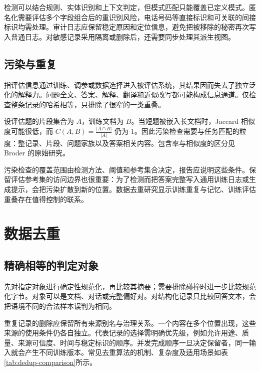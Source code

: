 \documentclass[../textbook.tex]{subfiles}
\begin{document}
检测可以结合规则、实体识别和上下文判定，但模式匹配只能覆盖已定义模式。匿名化需要评估多个字段组合后的重识别风险，电话号码等直接标识和可关联的间接标识均需处理。审计日志应保留稳定原因和定位信息，避免把被移除的秘密再次写入普通日志。对敏感记录采用隔离或删除后，还需要同步处理其派生视图。

\subsection{污染与重复}
指评估信息通过训练、调参或数据选择进入被评估系统，其结果因而失去了独立泛化的解释力。问题全文、答案、解释、翻译和近似改写都可能构成信息通道。仅检查整条记录的哈希相等，只排除了很窄的一类重叠。

设评估题的片段集合为 $A$，训练文档为 $B$。当短题被嵌入长文档时，Jaccard 相似度可能很低，而 $C(A,B)=\frac{|A\cap B|}{|A|}$ 仍为 $1$。因此污染检查需要与任务匹配的粒度：整记录、片段、问题家族以及答案相关内容。包含率与相似度的区分见 Broder 的原始研究\cite{broder1997resemblance}。

污染检查的覆盖范围由检测方法、阈值和参考集合决定，报告应说明这些条件。保留评估参考集的访问边界也很重要：为了检测而把答案完整写入通用训练日志或生成提示，会把污染扩散到新的位置。数据去重研究显示训练重复与记忆、训练评估重叠存在值得控制的联系\cite{lee2022deduplicating}。

\section{数据去重}

\subsection{精确相等的判定对象}
先对指定对象进行确定性规范化，再比较其摘要；需要排除碰撞时进一步比较规范化字节。对象可以是文档、对话或完整偏好对。对结构化记录只比较回答文本，会把语境不同的合法样本误判为相同。

重复记录的删除应保留所有来源别名与治理关系。一个内容在多个位置出现，这些来源的使用条件仍各自独立。代表记录的选择需明确优先级，例如允许用途、质量、来源可信度、时间与稳定标识的顺序。并发完成顺序一旦决定保留者，同一输入就会产生不同训练版本。常见去重算法的机制、复杂度及适用场景如表\ref{tab:dedup-comparison}所示。
\end{document}
